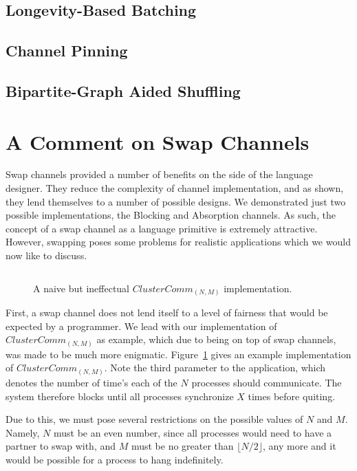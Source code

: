 \subsection{Longevity-Based Batching}\label{sec:results-longbatcher}
\subsection{Channel Pinning}\label{sec:results-channelpinner}
\subsection{Bipartite-Graph Aided Shuffling}\label{sec:results-smartsort}

\section{A Comment on Swap Channels}\label{sec:results-swap-channels}

Swap channels provided a number of benefits on the side of the language 
designer. They reduce the complexity of channel implementation, and as shown, 
they lend themselves to a number of possible designs. We demonstrated just two 
possible implementations, the Blocking and Absorption channels. As such, the 
concept of a swap channel as a language primitive is extremely attractive. 
However, swapping poses some problems for realistic applications which we would
now like to discuss.

\begin{figure}
\centering
\inputminted[frame=lines,fontsize=\footnotesize]{csharp}{code/badclustercomm.els}
\caption{A naive but ineffectual $ClusterComm_{(N,M)}$ implementation.} 
\label{fig:bad-clustercomm}
\end{figure}

First, a swap channel does not lend itself to a level of fairness that would be
expected by a programmer. We lead with our implementation of 
$ClusterComm_{(N,M)}$ as example, which due to being on top of swap channels, 
was made to be much more enigmatic. Figure~\ref{fig:bad-clustercomm} gives an
example implementation of $ClusterComm_{(N,M)}$. Note the third parameter to
the application, which denotes the number of time's each of the $N$ processes
should communicate. The system therefore blocks until all processes synchronize
$X$ times before quiting.

Due to this, we must pose several restrictions on the possible values of $N$ and
$M$. Namely, $N$ must be an even number, since all processes would need to have a 
partner to swap with, and $M$ must be no greater than $\lfloor N/2 \rfloor$, any
more and it would be possible for a process to hang indefinitely.

